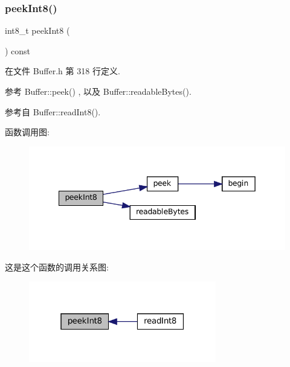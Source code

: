\subsubsection{\texorpdfstring{peek\+Int8()}{peekInt8()}}
{\footnotesize\ttfamily int8\+\_\+t peek\+Int8 (\begin{DoxyParamCaption}{ }\end{DoxyParamCaption}) const\hspace{0.3cm}{\ttfamily [inline]}}



在文件 Buffer.\+h 第 318 行定义.



参考 Buffer\+::peek() , 以及 Buffer\+::readable\+Bytes().



参考自 Buffer\+::read\+Int8().

函数调用图\+:
\nopagebreak
\begin{figure}[H]
\begin{center}
\leavevmode
\includegraphics[width=342pt]{classmuduo_1_1net_1_1Buffer_a28a767d788ebbb53bef6c939cfa8b5fb_cgraph}
\end{center}
\end{figure}
这是这个函数的调用关系图\+:
\nopagebreak
\begin{figure}[H]
\begin{center}
\leavevmode
\includegraphics[width=232pt]{classmuduo_1_1net_1_1Buffer_a28a767d788ebbb53bef6c939cfa8b5fb_icgraph}
\end{center}
\end{figure}
\mbox{\label{classmuduo_1_1net_1_1Buffer_a3099092e4d4138f55fb825a50f50f24b}} 
